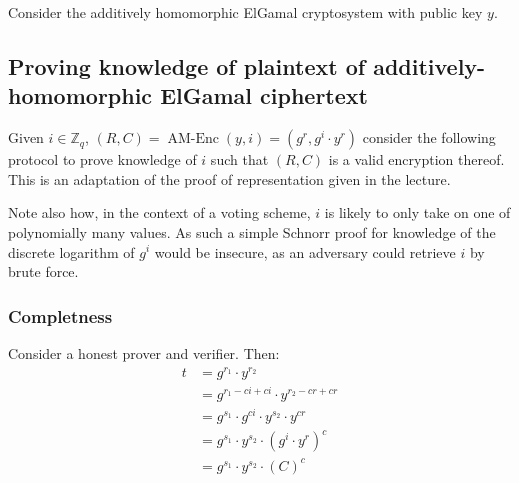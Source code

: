 \documentclass[a4paper]{scrreprt}
\begin{document}
Consider the additively homomorphic ElGamal cryptosystem with public key $y$.

\subsection{Proving knowledge of plaintext of additively-homomorphic ElGamal ciphertext}

Given $i \in \mathbb{Z}_q$, $(R, C) = \operatorname{AM-Enc}(y, i) = (g^r, g^i
\cdot y^r)$ consider the following protocol to prove knowledge of $i$ such that
$(R, C)$ is a valid encryption thereof. This is an adaptation of the proof of
representation given in the lecture.

Note also how, in the context of a voting scheme, $i$ is likely to only take on
one of polynomially many values. As such a simple Schnorr proof for knowledge
of the discrete logarithm of $g^i$ would be insecure, as an adversary could
retrieve $i$ by brute force.


\subsubsection{Completness}

Consider a honest prover and verifier. Then:
\begin{align*}
  t & = g^{r_1} \cdot y^{r_2} \\
    & = g^{r_1 - c i + c i} \cdot y^{r_2 - c r + c r} \\
    & = g^{s_1} \cdot g^{c i} \cdot y^{s_2} \cdot y^{c r} \\
    & = g^{s_1} \cdot y^{s_2} \cdot (g^i \cdot y^r)^c \\
    & = g^{s_1} \cdot y^{s_2} \cdot (C)^c \\
\end{align*}
\end{document}

